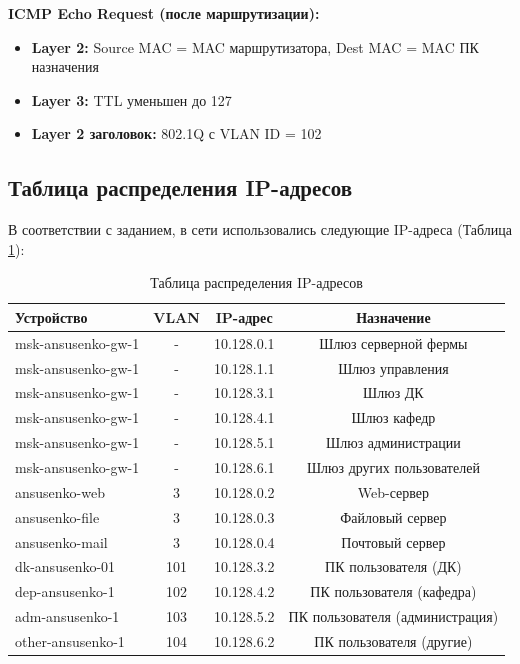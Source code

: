 \textbf{ICMP Echo Request (после маршрутизации):}
\begin{itemize}
    \item \textbf{Layer 2:} Source MAC = MAC маршрутизатора, Dest MAC = MAC ПК назначения
    \item \textbf{Layer 3:} TTL уменьшен до 127
    \item \textbf{Layer 2 заголовок:} 802.1Q с VLAN ID = 102
\end{itemize}

\subsection{Таблица распределения IP-адресов}

В соответствии с заданием, в сети использовались следующие IP-адреса (Таблица \ref{tab:ip}):

\begin{table}[h]
    \centering
    \caption{Таблица распределения IP-адресов}
    \label{tab:ip}
    \begin{tabular}{|p{4cm}|c|c|c|}
        \hline
        \textbf{Устройство} & \textbf{VLAN} & \textbf{IP-адрес} & \textbf{Назначение} \\
        \hline
        msk-ansusenko-gw-1 & - & 10.128.0.1 & Шлюз серверной фермы \\
        \hline
        msk-ansusenko-gw-1 & - & 10.128.1.1 & Шлюз управления \\
        \hline
        msk-ansusenko-gw-1 & - & 10.128.3.1 & Шлюз ДК \\
        \hline
        msk-ansusenko-gw-1 & - & 10.128.4.1 & Шлюз кафедр \\
        \hline
        msk-ansusenko-gw-1 & - & 10.128.5.1 & Шлюз администрации \\
        \hline
        msk-ansusenko-gw-1 & - & 10.128.6.1 & Шлюз других пользователей \\
        \hline
        ansusenko-web & 3 & 10.128.0.2 & Web-сервер \\
        \hline
        ansusenko-file & 3 & 10.128.0.3 & Файловый сервер \\
        \hline
        ansusenko-mail & 3 & 10.128.0.4 & Почтовый сервер \\
        \hline
        dk-ansusenko-01 & 101 & 10.128.3.2 & ПК пользователя (ДК) \\
        \hline
        dep-ansusenko-1 & 102 & 10.128.4.2 & ПК пользователя (кафедра) \\
        \hline
        adm-ansusenko-1 & 103 & 10.128.5.2 & ПК пользователя (администрация) \\
        \hline
        other-ansusenko-1 & 104 & 10.128.6.2 & ПК пользователя (другие) \\
        \hline
    \end{tabular}
\end{table}

